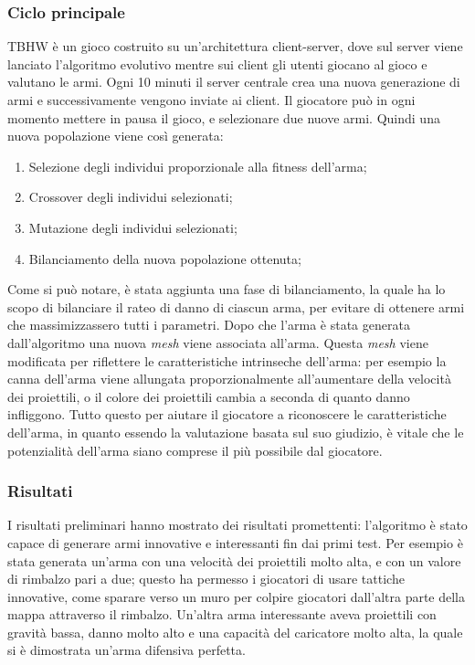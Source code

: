 \documentclass[12pt, italian]{toptesi}
\begin{document}
\subsubsection{Ciclo principale}
TBHW è un gioco costruito su un'architettura client-server, dove sul server viene lanciato l'algoritmo evolutivo mentre sui client gli utenti giocano al gioco e valutano le armi.
Ogni 10 minuti il server centrale crea una nuova generazione di armi e successivamente vengono inviate ai client.
Il giocatore può in ogni momento mettere in pausa il gioco, e selezionare due nuove armi.
Quindi una nuova popolazione viene così generata: 
\begin{enumerate}
\item Selezione degli individui proporzionale alla fitness dell'arma;
\item Crossover degli individui selezionati;
\item Mutazione degli individui selezionati;
\item Bilanciamento della nuova popolazione ottenuta;
\end{enumerate}
Come si può notare, è stata aggiunta una fase di bilanciamento, la quale ha lo scopo di bilanciare il rateo di danno di ciascun arma, per evitare di ottenere armi che massimizzassero tutti i parametri.
Dopo che l'arma è stata generata dall'algoritmo una nuova \emph{mesh} viene associata all'arma. 
Questa \emph{mesh} viene modificata per riflettere le caratteristiche intrinseche dell'arma: per esempio la canna dell'arma viene allungata proporzionalmente all'aumentare della velocità dei proiettili,
o il colore dei proiettili cambia a seconda di quanto danno infliggono.
Tutto questo per aiutare il giocatore a riconoscere le caratteristiche dell'arma, in quanto essendo la valutazione basata sul suo giudizio, è vitale che le potenzialità dell'arma siano comprese il più possibile dal giocatore.
\subsubsection{Risultati}
I risultati preliminari hanno mostrato dei risultati promettenti: l'algoritmo è stato capace di generare armi innovative e interessanti fin dai primi test.
Per esempio è stata generata un'arma con una velocità dei proiettili molto alta, e con un valore di rimbalzo pari a due; questo ha permesso i giocatori di usare tattiche innovative, come sparare verso un muro per colpire giocatori dall'altra parte della mappa attraverso il rimbalzo.
Un'altra arma interessante aveva proiettili con gravità bassa, danno molto alto e una capacità del caricatore molto alta, la quale si è dimostrata un'arma difensiva perfetta.
\end{document}
